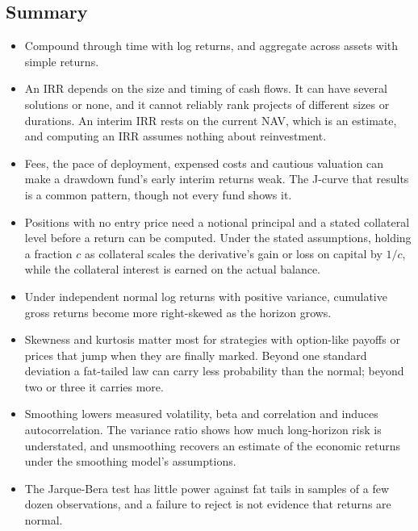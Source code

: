 \begin{chapterrefs}
\FloatBarrier
\section{Summary}
\label{sec:summary}

\begin{itemize}
  \item Compound through time with log returns, and aggregate across assets with simple returns.
  \item An IRR depends on the size and timing of cash flows. It can have several solutions or none, and
        it cannot reliably rank projects of different sizes or durations. An interim IRR rests on the
        current NAV, which is an estimate, and computing an IRR assumes nothing about reinvestment.
  \item Fees, the pace of deployment, expensed costs and cautious valuation can make a drawdown
        fund's early interim returns weak. The J-curve that results is a common pattern, though not every fund
        shows it.
  \item Positions with no entry price need a notional principal and a stated collateral level before
        a return can be computed. Under the stated assumptions, holding a fraction $c$ as collateral
        scales the derivative's gain or loss on capital by $1/c$, while the collateral interest is
        earned on the actual balance.
  \item Under independent normal log returns with positive variance, cumulative gross returns become
        more right-skewed as the horizon grows.
  \item Skewness and kurtosis matter most for strategies with option-like payoffs or prices that jump
        when they are finally marked. Beyond one standard deviation a fat-tailed law can carry less probability than the
        normal; beyond two or three it carries more.
  \item Smoothing lowers measured volatility, beta and correlation and induces autocorrelation. The
        variance ratio shows how much long-horizon risk is understated, and unsmoothing recovers an
        estimate of the economic returns under the smoothing model's assumptions.
  \item The Jarque-Bera test has little power against fat tails in samples of a few dozen
        observations, and a failure to reject is not evidence that returns are normal.
\end{itemize}


\end{chapterrefs}
